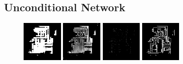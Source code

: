 \subsection{Unconditional Network}
\begin{figure}[h!] 
\begin{minipage}[b]{\linewidth}
	\begin{center}
		\includegraphics[width=2cm]{figures/results/samples/uncond/sample13_map_floormap_generated.png}
		\includegraphics[width=2cm]{figures/results/samples/uncond/sample13_map_heightmap_generated.png}
		\includegraphics[width=2cm]{figures/results/samples/uncond/sample13_map_thingsmap_generated.png}
		\includegraphics[width=2cm]{figures/results/samples/uncond/sample13_map_wallmap_generated.png}
	\end{center}
	

\end{minipage}
\end{figure}
